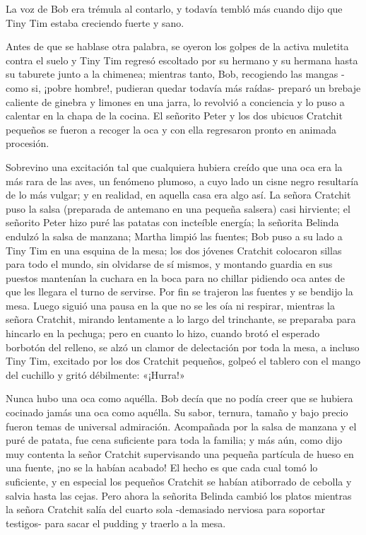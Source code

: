 \documentclass{novela}
\begin{document}
 La voz de Bob era trémula al contarlo, y todavía tembló más cuando dijo que Tiny Tim estaba creciendo fuerte y sano.

 Antes de que se hablase otra palabra, se oyeron los golpes de la activa muletita contra el suelo y Tiny Tim regresó escoltado por su hermano y su hermana hasta su taburete junto a la chimenea; mientras tanto, Bob, recogiendo las mangas -como si, ¡pobre hombre!, pudieran quedar todavía más raídas- preparó un brebaje caliente de ginebra y limones en una jarra, lo revolvió a conciencia y lo puso a calentar en la chapa de la cocina. El señorito Peter y los dos ubicuos Cratchit pequeños se fueron a recoger la oca y con ella regresaron pronto en animada procesión.

 Sobrevino una excitación tal que cualquiera hubiera creído que una oca era la más rara de las aves, un fenómeno plumoso, a cuyo lado un cisne negro resultaría de lo más vulgar; y en realidad, en aquella casa era algo así. La señora Cratchit puso la salsa (preparada de antemano en una pequeña salsera) casi hirviente; el señorito Peter hizo puré las patatas con incteíble energía; la señorita Belinda endulzó la salsa de manzana; Martha limpió las fuentes; Bob puso a su lado a Tiny Tim en una esquina de la mesa; los dos jóvenes Cratchit colocaron sillas para todo el mundo, sin olvidarse de sí mismos, y montando guardia en sus puestos mantenían la cuchara en la boca para no chillar pidiendo oca antes de que les llegara el turno de servirse. Por fin se trajeron las fuentes y se bendijo la mesa. Luego siguió una pausa en la que no se les oía ni respirar, mientras la señora Cratchit, mirando lentamente a lo largo del trinchante, se preparaba para hincarlo en la pechuga; pero en cuanto lo hizo, cuando brotó el esperado borbotón del relleno, se alzó un clamor de delectación por toda la mesa, a incluso Tiny Tim, excitado por los dos Cratchit pequeños, golpeó el tablero con el mango del cuchillo y gritó débilmente: «¡Hurra!»

 Nunca hubo una oca como aquélla. Bob decía que no podía creer que se hubiera cocinado jamás una oca como aquélla. Su sabor, ternura, tamaño y bajo precio fueron temas de universal admiración. Acompañada por la salsa de manzana y el puré de patata, fue cena suficiente para toda la familia; y más aún, como dijo muy contenta la señor Cratchit supervisando una pequeña partícula de hueso en una fuente, ¡no se la habían acabado! El hecho es que cada cual tomó lo suficiente, y en especial los pequeños Cratchit se habían atiborrado de cebolla y salvia hasta las cejas. Pero ahora la señorita Belinda cambió los platos mientras la señora Cratchit salía del cuarto sola -demasiado nerviosa para soportar testigos- para sacar el pudding y traerlo a la mesa.
\end{document}
